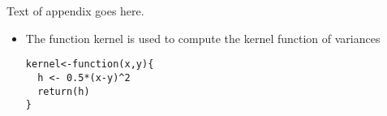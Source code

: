 Text of appendix goes here.

\begin{itemize}
\item The function kernel is used to compute the kernel function of variances
{\small
\begin{lstlisting}
kernel<-function(x,y){
  h <- 0.5*(x-y)^2
  return(h)
}
\end{lstlisting}
}
\end{itemize}